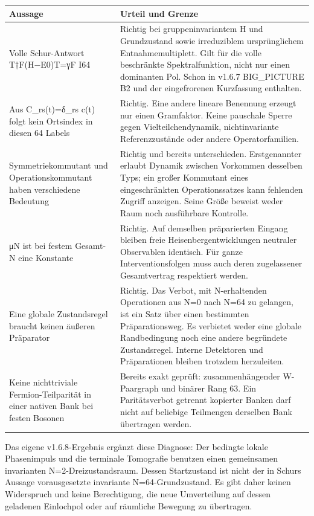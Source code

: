 {\def\LTcaptype{none} %
\begin{longtable}[]{@{}
  >{\raggedright\arraybackslash}p{}
  >{\raggedright\arraybackslash}p{}@{}}
\toprule\noalign{}
\begin{minipage}[b]{\linewidth}\raggedright
Aussage
\end{minipage} & \begin{minipage}[b]{\linewidth}\raggedright
Urteil und Grenze
\end{minipage} \\
\midrule\noalign{}
\endhead
\bottomrule\noalign{}
\endlastfoot
Volle Schur-Antwort T†F(H−E0)T=γF I64 & Richtig bei gruppeninvariantem H
und Grundzustand sowie irreduziblem ursprünglichem Entnahmemultiplett.
Gilt für die volle beschränkte Spektralfunktion, nicht nur einen
dominanten Pol. Schon in v1.6.7 BIG\_PICTURE B2 und der eingefrorenen
Kurzfassung enthalten. \\
Aus C\_rs(t)=δ\_rs c(t) folgt kein Ortsindex in diesen 64 Labels &
Richtig. Eine andere lineare Benennung erzeugt nur einen Gramfaktor.
Keine pauschale Sperre gegen Vielteilchendynamik, nichtinvariante
Referenzzustände oder andere Operatorfamilien. \\
Symmetriekommutant und Operationskommutant haben verschiedene Bedeutung
& Richtig und bereits unterschieden. Erstgenannter erlaubt Dynamik
zwischen Vorkommen desselben Typs; ein großer Kommutant eines
eingeschränkten Operationssatzes kann fehlenden Zugriff anzeigen. Seine
Größe beweist weder Raum noch ausführbare Kontrolle. \\
μN ist bei festem Gesamt-N eine Konstante & Richtig. Auf demselben
präparierten Eingang bleiben freie Heisenbergentwicklungen neutraler
Observablen identisch. Für ganze Interventionsfolgen muss auch deren
zugelassener Gesamtvertrag respektiert werden. \\
Eine globale Zustandsregel braucht keinen äußeren Präparator & Richtig.
Das Verbot, mit N-erhaltenden Operationen aus N=0 nach N=64 zu gelangen,
ist ein Satz über einen bestimmten Präparationsweg. Es verbietet weder
eine globale Randbedingung noch eine andere begründete Zustandsregel.
Interne Detektoren und Präparationen bleiben trotzdem herzuleiten. \\
Keine nichttriviale Fermion-Teilparität in einer nativen Bank bei festen
Bosonen & Bereits exakt geprüft: zusammenhängender W-Paargraph und
binärer Rang 63. Ein Paritätsverbot getrennt kopierter Banken darf nicht
auf beliebige Teilmengen derselben Bank übertragen werden. \\
\end{longtable}
}

Das eigene v1.6.8-Ergebnis ergänzt diese Diagnose: Der bedingte lokale
Phasenimpuls und die terminale Tomografie benutzen einen gemeinsamen
invarianten N=2-Dreizustandsraum. Dessen Startzustand ist nicht der in
Schurs Aussage vorausgesetzte invariante N=64-Grundzustand. Es gibt
daher keinen Widerspruch und keine Berechtigung, die neue Umverteilung
auf dessen geladenen Einlochpol oder auf räumliche Bewegung zu
übertragen.

